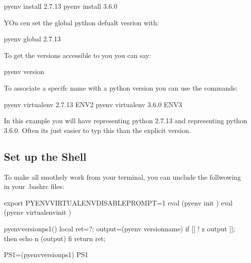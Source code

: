 \begin{sphinxVerbatim}[commandchars=\\\{\}]
\PYGZdl{} pyenv install 2.7.13
\PYGZdl{} pyenv install 3.6.0
\end{sphinxVerbatim}

YOu cen set the global python defualt vesrion with:

\begin{sphinxVerbatim}[commandchars=\\\{\}]
\PYGZdl{} pyenv global 2.7.13
\end{sphinxVerbatim}

To get the versions accessible to you you can say:

\begin{sphinxVerbatim}[commandchars=\\\{\}]
\PYGZdl{} pyenv version
\end{sphinxVerbatim}

To associate a specifc name with a python version you can use the
commands:

\begin{sphinxVerbatim}[commandchars=\\\{\}]
\PYGZdl{} pyenv virtualenv 2.7.13 ENV2
\PYGZdl{} pyenv virtualenv 3.6.0 ENV3
\end{sphinxVerbatim}

In this example you will have  representing python 2.7.13 and 
representing python 3.6.0. Often its just easier to typ this than the
explicit version.


\subsection{Set up the Shell}
\label{\detokenize{lesson/prg/pyenv:set-up-the-shell}}
To make all smothely work from your terminal, you can
unclude the follwowing in your .bashrc files:

\begin{sphinxVerbatim}[commandchars=\\\{\}]
export PYENV\PYGZus{}VIRTUALENV\PYGZus{}DISABLE\PYGZus{}PROMPT=1
eval \PYGZdq{}\PYGZdl{}(pyenv init \PYGZhy{})\PYGZdq{}
eval \PYGZdq{}\PYGZdl{}(pyenv virtualenv\PYGZhy{}init \PYGZhy{})\PYGZdq{}

\PYGZus{}\PYGZus{}pyenv\PYGZus{}version\PYGZus{}ps1() \PYGZob{}
  local ret=\PYGZdl{}?;
  output=\PYGZdl{}(pyenv version\PYGZhy{}name)
  if [[ ! \PYGZhy{}z \PYGZdl{}output ]]; then
    echo \PYGZhy{}n \PYGZdq{}(\PYGZdl{}output)\PYGZdq{}
  fi
  return \PYGZdl{}ret;
\PYGZcb{}

PS1=\PYGZdq{}\PYGZbs{}\PYGZdl{}(\PYGZus{}\PYGZus{}pyenv\PYGZus{}version\PYGZus{}ps1) \PYGZdl{}\PYGZob{}PS1\PYGZcb{}\PYGZdq{}
\end{sphinxVerbatim}


